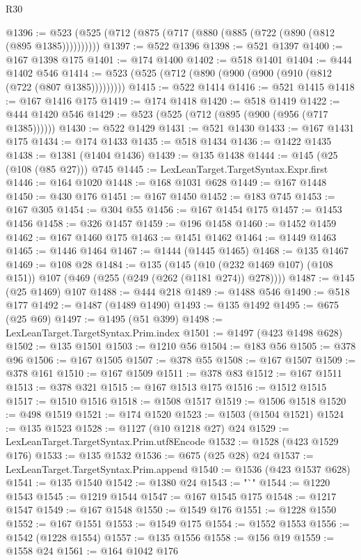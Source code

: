 \begin{lexlean}{R30}
\begin{coremodule}
@1396 := @523 (@525 (@712 (@875 (@717 (@880 (@885 (@722 (@890 (@812 (@895 @1385))))))))))
@1397 := @522 @1396
@1398 := @521 @1397
@1400 := @167 @1398 @175
@1401 := @174 @1400
@1402 := @518 @1401
@1404 := @444 @1402 @546
@1414 := @523 (@525 (@712 (@890 (@900 (@900 (@910 (@812 (@722 (@807 @1385)))))))))
@1415 := @522 @1414
@1416 := @521 @1415
@1418 := @167 @1416 @175
@1419 := @174 @1418
@1420 := @518 @1419
@1422 := @444 @1420 @546
@1429 := @523 (@525 (@712 (@895 (@900 (@956 (@717 @1385))))))
@1430 := @522 @1429
@1431 := @521 @1430
@1433 := @167 @1431 @175
@1434 := @174 @1433
@1435 := @518 @1434
@1436 := @1422 @1435
@1438 := @1381 (@1404 @1436)
@1439 := @135 @1438
@1444 := @145 (@25 (@108 (@85 @27))) @745
@1445 := LexLeanTarget.TargetSyntax.Expr.first
@1446 := @164 @1020
@1448 := @168 @1031 @628
@1449 := @167 @1448
@1450 := @430 @176
@1451 := @167 @1450
@1452 := @183 @745
@1453 := @167 @305
@1454 := @304 @55
@1456 := @167 @1454 @175
@1457 := @1453 @1456
@1458 := @326 @1457
@1459 := @196 @1458
@1460 := @1452 @1459
@1462 := @167 @1460 @175
@1463 := @1451 @1462
@1464 := @1449 @1463
@1465 := @1446 @1464
@1467 := @1444 (@1445 @1465)
@1468 := @135 @1467
@1469 := @108 @28
@1484 := @135
    (@145 (@10 (@232 @1469 @107) (@108 @151)) @107 (@469 (@255 (@249 (@262 (@1181 @274)) @278))))
@1487 := @145 (@25 @1469) @107
@1488 := @444 @218
@1489 := @1488 @546
@1490 := @518 @177
@1492 := @1487 (@1489 @1490)
@1493 := @135 @1492
@1495 := @675 (@25 @69)
@1497 := @1495 (@51 @399)
@1498 := LexLeanTarget.TargetSyntax.Prim.index
@1501 := @1497 (@423 @1498 @628)
@1502 := @135 @1501
@1503 := @1210 @56
@1504 := @183 @56
@1505 := @378 @96
@1506 := @167 @1505
@1507 := @378 @55
@1508 := @167 @1507
@1509 := @378 @161
@1510 := @167 @1509
@1511 := @378 @83
@1512 := @167 @1511
@1513 := @378 @321
@1515 := @167 @1513 @175
@1516 := @1512 @1515
@1517 := @1510 @1516
@1518 := @1508 @1517
@1519 := @1506 @1518
@1520 := @498 @1519
@1521 := @174 @1520
@1523 := @1503 (@1504 @1521)
@1524 := @135 @1523
@1528 := @1127 (@10 @1218 @27) @24
@1529 := LexLeanTarget.TargetSyntax.Prim.utf8Encode
@1532 := @1528 (@423 @1529 @176)
@1533 := @135 @1532
@1536 := @675 (@25 @28) @24
@1537 := LexLeanTarget.TargetSyntax.Prim.append
@1540 := @1536 (@423 @1537 @628)
@1541 := @135 @1540
@1542 := @1380 @24
@1543 := "`"
@1544 := @1220 @1543
@1545 := @1219 @1544
@1547 := @167 @1545 @175
@1548 := @1217 @1547
@1549 := @167 @1548
@1550 := @1549 @176
@1551 := @1228 @1550
@1552 := @167 @1551
@1553 := @1549 @175
@1554 := @1552 @1553
@1556 := @1542 (@1228 @1554)
@1557 := @135 @1556
@1558 := @156 @19
@1559 := @1558 @24
@1561 := @164 @1042 @176

\end{coremodule}
\end{lexlean}
